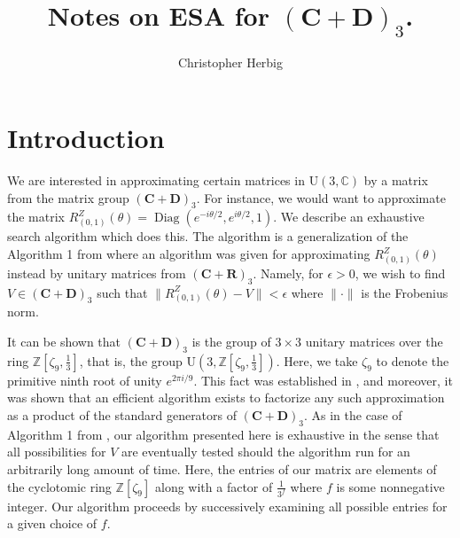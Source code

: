 \documentclass[12pt]{amsart}
\theoremstyle{definition}
\newcommand{\bC}{\mathbf{C}}
\newcommand{\bD}{\mathbf{D}}
\newcommand{\Z}{\mathbb{Z}}
\newcommand{\C}{\mathbb{C}}
\newcommand{\U}{{\mathrm {U}}} %
\DeclareMathOperator{\Diag}{Diag}
\newcommand{\CD}{(\mathbf{C} + \mathbf{D})_3}
\newcommand{\CR}{(\mathbf{C} + \mathbf{R})_3}
\begin{document}
	
\title{Notes on ESA for $(\bC + \bD)_3$.}
	
	
	
	\author[Christopher Herbig]{Christopher Herbig}
	\address{
		Northern Illinois University\\
		Department of Mathematical Sciences\\
		Dekalb, IL 60115\\
		USA}
	

	
	
	
	
	\maketitle
	
	\section{Introduction}
	
	We are interested in approximating certain matrices in $\U(3,\C)$ by a matrix from the matrix group $(\bC+ \bD)_3$. For instance, we would want to approximate the matrix $R_{(0,1)}^Z(\theta) = \Diag(e^{-i\theta/2}, e^{i\theta/2}, 1)$. We describe an exhaustive search algorithm which does this. The algorithm is a generalization of the Algorithm 1 from \cite{Gust} where an algorithm was given for approximating $R_{(0,1)}^Z(\theta)$ instead by unitary matrices from $\CR$. Namely, for $\epsilon > 0$, we wish to find $V \in \CD$ such that $\| R_{(0,1)}^Z(\theta) - V \| < \epsilon$ where $\| \cdot \|$ is the Frobenius norm. 
	 
	
	It can be shown that $\CD$ is the group of $3 \times 3$ unitary matrices over the ring $\Z[\zeta_9, \frac{1}{3}]$, that is, the group $\U(3,\Z[\zeta_9, \frac{1}{3}])$. Here, we take $\zeta_9$ to denote the primitive ninth root of unity $e^{2\pi i/9}$. This fact was established in \cite[Theorem 2.8]{EvPar}, and moreover, it was shown that an efficient algorithm exists to factorize any such approximation as a product of the standard generators of $\CD$. As in the case of Algorithm 1 from \cite{Gust}, our algorithm presented here is exhaustive in the sense that all possibilities for $V$ are eventually tested should the algorithm run for an arbitrarily long amount of time. Here, the entries of our  matrix are elements of the cyclotomic ring $\Z[\zeta_9]$ along with a factor of $\frac{1}{3^f}$ where $f$ is some nonnegative integer. Our algorithm proceeds by successively examining all possible entries for a given choice of $f$. 
	
\end{document}
